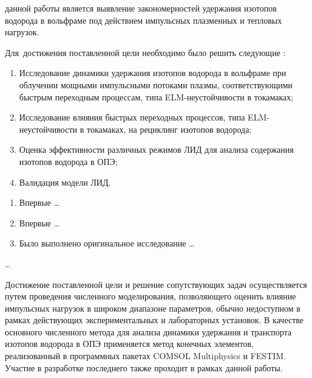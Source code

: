 {\aim} данной работы является выявление закономерностей удержания изотопов водорода в вольфраме под действием импульсных плазменных и тепловых нагрузок.

Для~достижения поставленной цели необходимо было решить следующие {\tasks}:
\begin{enumerate}[beginpenalty=10000] %
    \item Исследование динамики удержания изотопов водорода в вольфраме при облучении мощными импульсными потоками плазмы, соответствующими быстрым переходным процессам, типа ELM-неустойчивости в токамаках;
    \item Исследование влияния быстрых переходных процессов, типа ELM-неустойчивости в токамаках, на рециклинг изотопов водорода;
    \item Оценка эффективности различных режимов ЛИД для анализа содержания изотопов водорода в ОПЭ;
    \item Валидация модели ЛИД.
\end{enumerate}


{\novelty}
\begin{enumerate}[beginpenalty=10000] %
  \item Впервые \ldots
  \item Впервые \ldots
  \item Было выполнено оригинальное исследование \ldots
\end{enumerate}

{\influence} \ldots

{\methods} Достижение поставленной цели и решение сопутствующих задач осуществляется путем проведения численного моделирования, 
позволяющего оценить влияние импульсных нагрузок в широком диапазоне параметров, обычно недоступном в рамках действующих экспериментальных 
и лабораторных установок. В качестве основного численного метода для анализа динамики удержания и транспорта изотопов водорода в ОПЭ применяется 
метод конечных элементов, реализованный в программных пакетах COMSOL Multiphysics и FESTIM. Участие в разработке 
последнего также проходит в рамках данной работы.

